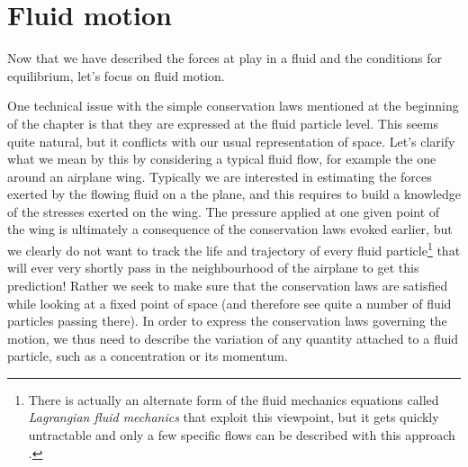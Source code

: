 \section{Fluid motion}
Now that we have described the forces at play in a fluid and the conditions for equilibrium, let's focus on fluid motion. 

One technical issue with the simple conservation laws mentioned at the beginning of the chapter is that they are expressed at the fluid particle level. This seems quite natural, but it conflicts with our usual representation of space. Let's clarify what we mean by this by considering a typical fluid flow, for example the one around an airplane wing. Typically we are interested in estimating the forces exerted by the flowing fluid on a the plane, and this requires to build a knowledge of the stresses exerted on the wing. The pressure applied at one given point of the wing is ultimately a consequence of the conservation laws evoked earlier, but we clearly do not want to track the life and trajectory of every fluid particle\footnote{There is actually an alternate form of the fluid mechanics equations called \textit{Lagrangian fluid mechanics} that exploit this viewpoint, but it gets quickly untractable and only a few specific flows can be described with this approach \citep{Bennett2006}.} that will ever very shortly pass in the neighbourhood of the airplane to get this prediction! Rather we seek to make sure that the conservation laws are satisfied while looking at a fixed point of space (and therefore see quite a number of fluid particles passing there). In order to express the conservation laws governing the motion, we thus need to describe the variation of any quantity attached to a fluid particle, such as a concentration or its momentum.
